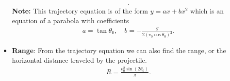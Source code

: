 \documentclass{report}
\begin{document}
\begin{itemize}
\begin{align*}
                .\end{align*}
                \textbf{Note:} This trajectory equation is of the form $y=ax+bx^{2}$
                which is an equation of a parabola with coefficients
                \begin{align*}
                    a = \tan{\theta_{0}}, \quad b = -\frac{g}{2(v_{0}\cos{\theta_{0}})^{2}}
                .\end{align*}
            \item \textbf{Range}: From the trajectory equation we can also find the range, or the horizontal distance traveled by the projectile.
                \begin{align*}
                    R = \frac{v_{0}^{2}\sin{(2\theta_{0})}}{g}
                .\end{align*}


\end{itemize}
\end{document}
